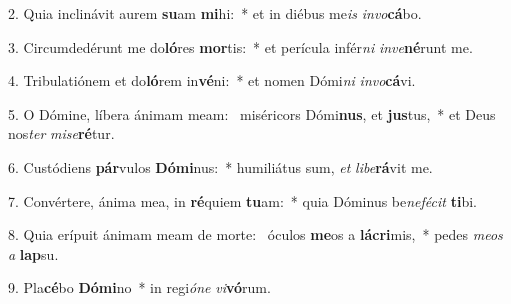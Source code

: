 2. Quia inclinávit aurem \textbf{su}am \textbf{mi}hi:~*  et in diébus me\textit{is} \textit{in}\textit{vo}\textbf{cá}bo.\

3. Circumdedérunt me do\textbf{ló}res \textbf{mor}tis:~*  et perícula infér\textit{ni} \textit{in}\textit{ve}\textbf{né}runt me.\

4. Tribulatiónem et do\textbf{ló}rem in\textbf{vé}ni:~*  et nomen Dómi\textit{ni} \textit{in}\textit{vo}\textbf{cá}vi.\

5. O Dómine, líbera ánimam meam: \dag\  miséricors Dómi\textbf{nus}, et \textbf{jus}tus,~*  et Deus nos\textit{ter} \textit{mi}\textit{se}\textbf{ré}tur.\

6. Custódiens \textbf{pár}vulos \textbf{Dó}\textbf{mi}nus:~*  humiliátus sum, \textit{et} \textit{li}\textit{be}\textbf{rá}vit me.\

7. Convértere, ánima mea, in \textbf{ré}quiem \textbf{tu}am:~*  quia Dóminus be\textit{ne}\textit{fé}\textit{cit} \textbf{ti}bi.\

8. Quia erípuit ánimam meam de morte: \dag\  óculos \textbf{me}os a \textbf{lá}\textbf{cri}mis,~*  pedes \textit{me}\textit{os} \textit{a} \textbf{lap}su.\

9. Pla\textbf{cé}bo \textbf{Dó}\textbf{mi}no~*  in regi\textit{ó}\textit{ne} \textit{vi}\textbf{vó}rum.\

